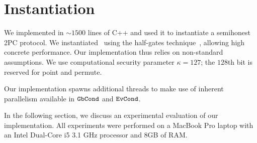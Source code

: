 \section{Instantiation}\label{sec:instantiation}

We implemented  \ourscheme in $\sim1500$ lines of C++ and used it to instantiate a semihonest 2PC protocol.
We instantiated \underscheme\ using the half-gates
technique~\cite{EC:ZahRosEva15}, allowing high
concrete performance.
Our implementation thus relies on non-standard assumptions.
%
We use computational security parameter $\kappa=127$; the $128$th bit is reserved for point and permute.

Our implementation spawns additional threads to make use of inherent
parallelism available in $\mathtt{GbCond}$ and $\mathtt{EvCond}$.

In the following section, we discuss an experimental evaluation of our
implementation.
All experiments were performed on a MacBook Pro laptop with an Intel
Dual-Core i5 3.1 GHz processor and 8GB of RAM.
%
%
